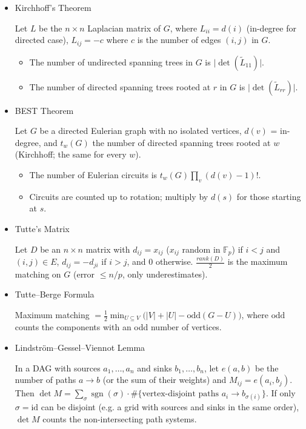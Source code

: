 \begin{itemize}
\item Kirchhoff's Theorem

Let $L$ be the $n \times n$ Laplacian matrix of $G$, where $L_{ii} = d(i)$ (in-degree for directed case), $L_{ij} = -c$ where $c$ is the number of edges $(i, j)$ in $G$.
\begin{itemize}
  \item The number of undirected spanning trees in $G$ is $\lvert \det(\tilde{L}_{11}) \rvert$.
  \item The number of directed spanning trees rooted at $r$ in $G$ is $\lvert \det(\tilde{L}_{rr}) \rvert$.
\end{itemize}

\item BEST Theorem

Let $G$ be a directed Eulerian graph with no isolated vertices, $d(v)$ = in-degree, and $t_w(G)$ the number of directed spanning trees rooted at $w$ (Kirchhoff; the same for every $w$).
\begin{itemize}
  \item The number of Eulerian circuits is $t_w(G) \prod_v (d(v) - 1)!$.
  \item Circuits are counted up to rotation; multiply by $d(s)$ for those starting at $s$.
\end{itemize}

\item Tutte's Matrix

Let $D$ be an $n \times n$ matrix with $d_{ij} = x_{ij}$ ($x_{ij}$ random in $\mathbb{F}_p$) if $i < j$ and $(i, j) \in E$, $d_{ij} = -d_{ji}$ if $i > j$, and $0$ otherwise. $\frac{rank(D)}{2}$ is the maximum matching on $G$ (error $\le n/p$, only underestimates).

\item Tutte–Berge Formula

Maximum matching $= \frac 1 2 \min_{U \subseteq V} \big(|V| + |U| - \mathrm{odd}(G - U)\big)$, where $\mathrm{odd}$ counts the components with an odd number of vertices.

\item Lindström–Gessel–Viennot Lemma

In a DAG with sources $a_1, \ldots, a_n$ and sinks $b_1, \ldots, b_n$, let $e(a, b)$ be the number of paths $a \to b$ (or the sum of their weights) and $M_{ij} = e(a_i, b_j)$. Then $\det M = \sum_{\sigma} \operatorname{sgn}(\sigma) \cdot \#\{\text{vertex-disjoint paths } a_i \to b_{\sigma(i)}\}$. If only $\sigma = \mathrm{id}$ can be disjoint (e.g. a grid with sources and sinks in the same order), $\det M$ counts the non-intersecting path systems.


\end{itemize}
